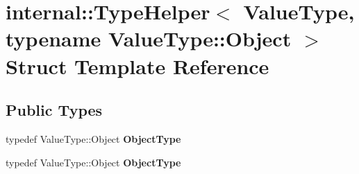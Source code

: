 \hypertarget{structinternal_1_1_type_helper_3_01_value_type_00_01typename_01_value_type_1_1_object_01_4}{}\section{internal\+:\+:Type\+Helper$<$ Value\+Type, typename Value\+Type\+:\+:Object $>$ Struct Template Reference}
\label{structinternal_1_1_type_helper_3_01_value_type_00_01typename_01_value_type_1_1_object_01_4}
\subsection*{Public Types}
\begin{DoxyCompactItemize}
\item 
typedef Value\+Type\+::\+Object {\bfseries Object\+Type}\hypertarget{structinternal_1_1_type_helper_3_01_value_type_00_01typename_01_value_type_1_1_object_01_4_ac5d59bffe76792786fd5f1ba4da94dd9}{}\label{structinternal_1_1_type_helper_3_01_value_type_00_01typename_01_value_type_1_1_object_01_4_ac5d59bffe76792786fd5f1ba4da94dd9}

\item 
typedef Value\+Type\+::\+Object {\bfseries Object\+Type}\hypertarget{structinternal_1_1_type_helper_3_01_value_type_00_01typename_01_value_type_1_1_object_01_4_ac5d59bffe76792786fd5f1ba4da94dd9}{}\label{structinternal_1_1_type_helper_3_01_value_type_00_01typename_01_value_type_1_1_object_01_4_ac5d59bffe76792786fd5f1ba4da94dd9}

\end{DoxyCompactItemize}
